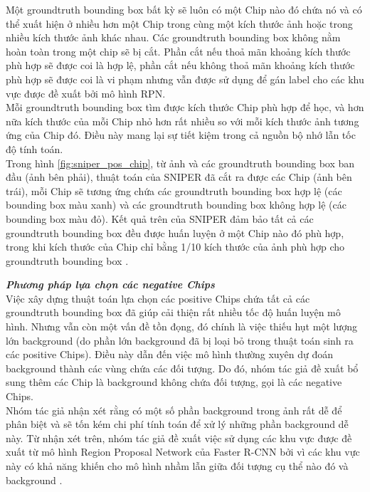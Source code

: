 {    \noindent
    Một groundtruth  bounding box  bất kỳ sẽ luôn có một Chip nào đó chứa nó và có thể xuất hiện ở nhiều hơn một Chip trong cùng một kích thước ảnh hoặc trong nhiều kích thước ảnh khác nhau.
    Các groundtruth  bounding box  không nằm hoàn toàn trong một chip sẽ bị cắt.
    Phần cắt nếu thoả mãn khoảng kích thước phù hợp sẽ được coi là hợp lệ, phần cắt nếu không thoả mãn khoảng kích thước phù hợp sẽ được coi là vi phạm nhưng vẫn được sử dụng để gán label cho các khu vực được đề xuất bởi mô hình RPN. \\
    Mỗi groundtruth  bounding box  tìm được kích thước Chip phù hợp để học, và hơn nữa kích thước của mỗi Chip nhỏ hơn rất nhiều so với mỗi kích thước ảnh tương ứng của Chip đó.
    Điều này mang lại sự tiết kiệm trong cả nguồn bộ nhớ lẫn tốc độ tính toán. \\
    Trong hình \ref{fig:sniper_pos_chip}, từ ảnh và các groundtruth  bounding box  ban đầu (ảnh bên phải), thuật toán của SNIPER  đã cắt ra được các Chip (ảnh bên trái), mỗi Chip sẽ tương ứng chứa các groundtruth  bounding box  hợp lệ (các bounding box  màu xanh) và các groundtruth  bounding box  không hợp lệ (các bounding box  màu đỏ).
    Kết quả trên của SNIPER  đảm bảo tất cả các groundtruth  bounding box  đều được huấn luyện ở một Chip nào đó phù hợp, trong khi kích thước của Chip chỉ bằng 1/10 kích thước của ảnh phù hợp cho groundtruth  bounding box .

    \noindent
    \textbf{\textit{Phương pháp lựa chọn các negative Chips}} \\
    Việc xây dựng thuật toán lựa chọn các positive Chips chứa tất cả các groundtruth  bounding box  đã giúp cải thiện rất nhiều tốc độ huấn luyện mô hình.
    Nhưng vẫn còn một vấn đề tồn đọng, đó chính là việc thiếu hụt một lượng lớn background  (do phần lớn background  đã bị loại bỏ trong thuật toán sinh ra các positive Chips).
    Điều này dẫn đến việc mô hình thường xuyên dự đoán background  thành các vùng chứa các đối tượng.
    Do đó, nhóm tác giả đề xuất bổ sung thêm các Chip là background  không chứa đối tượng, gọi là các negative Chips. \\
    Nhóm tác giả nhận xét rằng có một số phần background  trong ảnh rất dễ để phân biệt và sẽ tốn kém chi phí tính toán để xử lý những phần background  dễ này.
    Từ nhận xét trên, nhóm tác giả đề xuất việc sử dụng các khu vực được đề xuất từ mô hình Region Proposal Network của Faster R-CNN bởi vì các khu vực này có khả năng khiến cho mô hình nhầm lẫn giữa đối tượng cụ thể nào đó và background .

}
